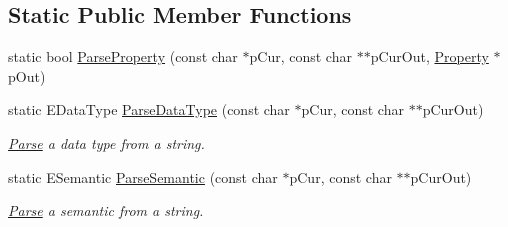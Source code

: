 \subsection*{Static Public Member Functions}
\begin{DoxyCompactItemize}
\item 
static bool \hyperlink{class_assimp_1_1_p_l_y_1_1_property_a8e8f4cba19bf0f1b29b0d2aa11c4289b}{Parse\+Property} (const char $\ast$p\+Cur, const char $\ast$$\ast$p\+Cur\+Out, \hyperlink{class_assimp_1_1_p_l_y_1_1_property}{Property} $\ast$p\+Out)
\item 
\hypertarget{class_assimp_1_1_p_l_y_1_1_property_ae42da59426435424cb7a6f420d000e11}{static E\+Data\+Type \hyperlink{class_assimp_1_1_p_l_y_1_1_property_ae42da59426435424cb7a6f420d000e11}{Parse\+Data\+Type} (const char $\ast$p\+Cur, const char $\ast$$\ast$p\+Cur\+Out)}\label{class_assimp_1_1_p_l_y_1_1_property_ae42da59426435424cb7a6f420d000e11}

\begin{DoxyCompactList}\small\item\em \hyperlink{struct_parse}{Parse} a data type from a string. \end{DoxyCompactList}\item 
\hypertarget{class_assimp_1_1_p_l_y_1_1_property_a9abbfab27b9e6207400920a6ea8c9187}{static E\+Semantic \hyperlink{class_assimp_1_1_p_l_y_1_1_property_a9abbfab27b9e6207400920a6ea8c9187}{Parse\+Semantic} (const char $\ast$p\+Cur, const char $\ast$$\ast$p\+Cur\+Out)}\label{class_assimp_1_1_p_l_y_1_1_property_a9abbfab27b9e6207400920a6ea8c9187}

\begin{DoxyCompactList}\small\item\em \hyperlink{struct_parse}{Parse} a semantic from a string. \end{DoxyCompactList}\end{DoxyCompactItemize}
